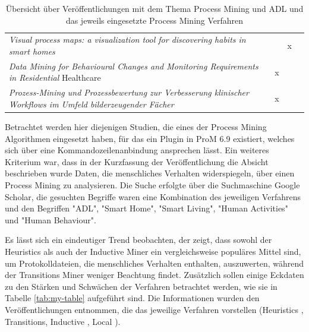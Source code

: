 \begin{table}[!ht]
\begin{tabularx}{\textwidth}{b ccc}
\textit{Visual process maps: a visualization tool for discovering habits in smart homes} \cite{adl9}                            &                                        & x                                      &                                         \\
\textit{Data Mining for Behavioural Changes and Monitoring Requirements in Residential} Healthcare \cite{adl10}                  & x                                      &                                        &                                         \\
\textit{Prozess-Mining und Prozessbewertung zur Verbesserung klinischer Workflows im Umfeld bilderzeugender Fächer} \cite{adl11} & x                                      &                                        &                                         \\ \hline

\end{tabularx}

\caption{Übersicht über Veröffentlichungen mit dem Thema Process Mining und ADL und das jeweils eingesetzte Process Mining Verfahren}
 \label{tab:miningPaper}
\end{table}
\normalsize
Betrachtet werden hier diejenigen Studien, die eines der Process Mining Algorithmen eingesetzt haben, für das ein Plugin in ProM 6.9 existiert, welches sich über eine Kommandozeilenanbindung ansprechen lässt. Ein weiteres Kriterium war, dass in der Kurzfassung der Veröffentlichung die Absicht beschrieben wurde Daten, die menschliches Verhalten widerspiegeln, über einen Process Mining zu analysieren. Die Suche erfolgte über die Suchmaschine Google Scholar, die gesuchten Begriffe waren eine Kombination des jeweiligen Verfahrens und den Begriffen "ADL", "Smart Home", "Smart Living", "Human Activities" und "Human Behaviour". 

Es lässt sich ein eindeutiger Trend beobachten, der zeigt, dass sowohl der Heuristics als auch der Inductive Miner ein vergleichsweise populäres Mittel sind, um Protokolldateien, die menschliches Verhalten enthalten, auszuwerten, während der Transitions Miner weniger Beachtung findet. Zusätzlich sollen einige Eckdaten zu den Stärken und Schwächen der Verfahren betrachtet werden, wie sie in Tabelle \ref{tab:my-table} aufgeführt sind. Die Informationen wurden den Veröffentlichungen entnommen, die das jeweilige Verfahren vorstellen (Heuristics \cite{heurMining}, Transitions\cite{transMiner}, Inductive \cite{inducIMining}, Local \cite{localMining}). 

